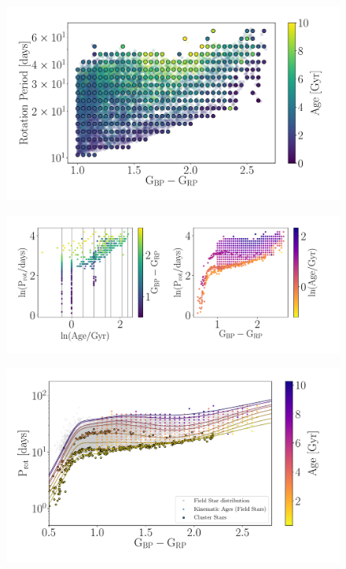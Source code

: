 \begin{figure}
\caption{
}
  \centering \includegraphics[width=1\textwidth]{grid_points}
\end{figure}

\begin{figure}
\caption{
}
  \centering \includegraphics[width=1\textwidth]{gp_fit_data_multi-panel}
\end{figure}

\begin{figure}
\caption{
}
  \centering \includegraphics[width=1\textwidth]{gp_fit}
\end{figure}


